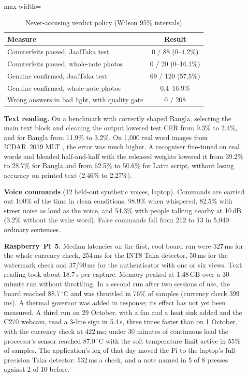 \documentclass[conference]{IEEEtran}
\begin{document}
\begin{table}[t]
\caption{Never-accusing verdict policy (Wilson 95\% intervals)}
\label{tab:safe}
\centering\small
\begin{adjustbox}{max width=\columnwidth}\begin{tabular}{@{}lc@{}}
\toprule
Measure & Result \\ \midrule
Counterfeits passed, JaalTaka test & 0 / 88 (0--4.2\%) \\
Counterfeits passed, whole-note photos & 0 / 20 (0--16.1\%) \\
Genuine confirmed, JaalTaka test & 69 / 120 (57.5\%) \\
Genuine confirmed, whole-note photos & 0.4--16.9\% \\
Wrong answers in bad light, with quality gate & 0 / 208 \\ \bottomrule
\end{tabular}\end{adjustbox}
\end{table}

\textbf{Text reading.} On a benchmark with correctly shaped Bangla, selecting the main text block and cleaning the output lowered test CER from 9.3\% to 2.4\%, and for Bangla from 11.9\% to 3.2\%. On 1,000 real word images from ICDAR~2019 MLT \cite{mlt2019}, the error was much higher. A recogniser fine-tuned on real words and blended half-and-half with the released weights lowered it from 39.2\% to 28.7\% for Bangla and from 62.5\% to 50.6\% for Latin script, without losing accuracy on printed text (2.46\% to 2.27\%).

\textbf{Voice commands} (12 held-out synthetic voices, laptop). Commands are carried out 100\% of the time in clean conditions, 98.9\% when whispered, 82.5\% with street noise as loud as the voice, and 54.3\% with people talking nearby at 10\,dB (3.2\% without the wake word). False commands fall from 212 to 13 in 5,040 ordinary sentences.

\textbf{Raspberry~Pi~5.} Median latencies on the first, cool-board run were 327\,ms for the whole currency check, 254\,ms for the INT8 Taka detector, 50\,ms for the watermark check and 37/90\,ms for the authenticator with one or six views. Text reading took about 18.7\,s per capture. Memory peaked at 1.48\,GB over a 30-minute run without throttling. In a second run after two sessions of use, the board reached 88.7\,$^\circ$C and was throttled in 76\% of samples (currency check 399\,ms). A thermal governor was added in response; its effect has not yet been measured. A third run on 29 October, with a fan and a heat sink added and the C270 webcam, read a 3-line sign in 5.4\,s, three times faster than on 1 October, with the currency check at 422\,ms; under 30 minutes of continuous load the processor's sensor reached 87.0\,$^\circ$C with the soft temperature limit active in 55\% of samples. The application's log of that day moved the Pi to the laptop's full-precision Taka detector: 532\,ms a check, and a note named in 5 of 8 presses against 2 of 10 before.
\end{document}
